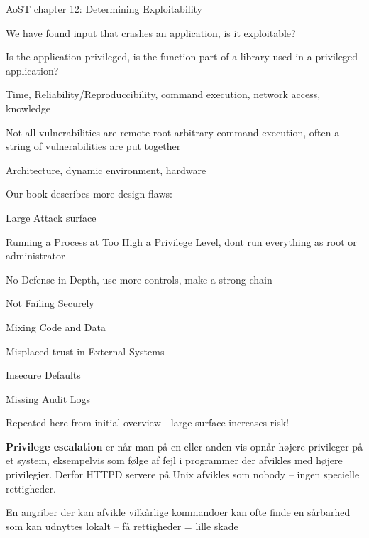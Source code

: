 \documentclass[Screen16to9,17pt]{foils}
\begin{document}



\begin{list2}
\item AoST chapter 12: Determining Exploitability
\item We have found input that crashes an application, is it exploitable?
\item Is the application privileged, is the function part of a library used in a privileged application?
\item Time, Reliability/Reproduccibility, command execution, network access, knowledge
\item Not all vulnerabilities are remote root arbitrary command execution, often a string of vulnerabilities are put together
\item Architecture, dynamic environment, hardware
\end{list2}


Our book describes more design flaws:
\begin{list2}
\item Large Attack surface
\item Running a Process at Too High a Privilege Level, dont run everything as root or administrator
\item No Defense in Depth, use more controls, make a strong chain
\item Not Failing Securely
\item Mixing Code and Data
\item Misplaced trust in External Systems
\item Insecure Defaults
\item Missing Audit Logs
\end{list2}

Repeated here from initial overview - large surface increases risk!


\begin{list1}
\item {\bfseries Privilege escalation} er når man på en eller anden vis
opnår højere privileger på et system, eksempelvis som
følge af fejl i programmer der afvikles med højere
privilegier. Derfor HTTPD servere på Unix afvikles som
nobody -- ingen specielle rettigheder.
\item En angriber der kan afvikle vilkårlige kommandoer kan ofte finde
  en sårbarhed som kan udnyttes lokalt -- få rettigheder = lille skade
\end{list1}
\end{document}
